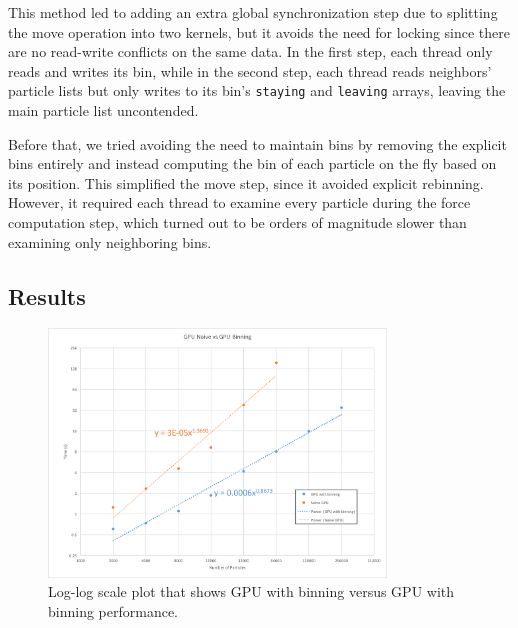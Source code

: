 \documentclass[12pt]{article}
\begin{document}
This method led to adding an extra global synchronization step due to splitting the move operation into two kernels, but it avoids the need for locking since there are no read-write conflicts on the same data. In the first step, each thread only reads and writes its bin, while in the second step, each thread reads neighbors' particle lists but only writes to its bin's \texttt{staying} and \texttt{leaving} arrays, leaving the main particle list uncontended.

Before that, we tried avoiding the need to maintain bins by removing the explicit bins entirely and instead computing the bin of each particle on the fly based on its position. This simplified the move step, since it avoided explicit rebinning. However, it required each thread to examine every particle during the force computation step, which turned out to be orders of magnitude slower than examining only neighboring bins.

\subsection{Results}

\begin{figure}
  \centering
  \includegraphics[width=0.8\textwidth]{graphs/gpu_binning_vs_gpu_serial.png}
  \caption{Log-log scale plot that shows GPU with binning versus GPU with binning performance.}
  \label{fig:gpu-compare}
\end{figure}
\end{document}
